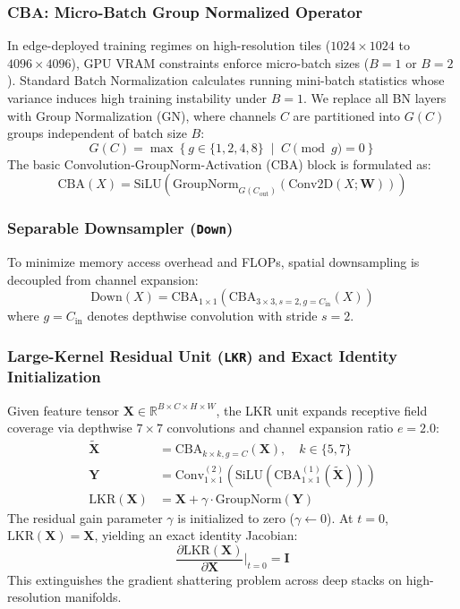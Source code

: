 \documentclass[11pt,a4paper]{article}
\begin{document}
\subsubsection{CBA: Micro-Batch Group Normalized Operator}
In edge-deployed training regimes on high-resolution tiles ($1024\times 1024$ to $4096\times 4096$), GPU VRAM constraints enforce micro-batch sizes ($B=1$ or $B=2$). Standard Batch Normalization calculates running mini-batch statistics whose variance induces high training instability under $B=1$. We replace all BN layers with Group Normalization (GN), where channels $C$ are partitioned into $G(C)$ groups independent of batch size $B$:
\begin{equation}
G(C) = \max \left\{ g \in \{1, 2, 4, 8\} \;\middle|\; C \pmod g = 0 \right\}
\end{equation}
The basic Convolution-GroupNorm-Activation (CBA) block is formulated as:
\begin{equation}
\text{CBA}(X) = \text{SiLU}\left( \text{GroupNorm}_{G(C_{\text{out}})}\left( \text{Conv2D}(X; \mathbf{W}) \right) \right)
\end{equation}

\subsubsection{Separable Downsampler (\texttt{Down})}
To minimize memory access overhead and FLOPs, spatial downsampling is decoupled from channel expansion:
\begin{equation}
\text{Down}(X) = \text{CBA}_{1\times 1}\left( \text{CBA}_{3\times 3, s=2, g=C_{\text{in}}}(X) \right)
\end{equation}
where $g=C_{\text{in}}$ denotes depthwise convolution with stride $s=2$.

\subsubsection{Large-Kernel Residual Unit (\texttt{LKR}) and Exact Identity Initialization}
Given feature tensor $\mathbf{X} \in \mathbb{R}^{B \times C \times H \times W}$, the LKR unit expands receptive field coverage via depthwise $7\times 7$ convolutions and channel expansion ratio $e = 2.0$:
\begin{align}
\widetilde{\mathbf{X}} &= \text{CBA}_{k\times k, g=C}(\mathbf{X}), \quad k \in \{5, 7\} \\
\mathbf{Y} &= \text{Conv}_{1\times 1}^{(2)}\left( \text{SiLU}\left( \text{CBA}_{1\times 1}^{(1)}(\widetilde{\mathbf{X}}) \right) \right) \\
\text{LKR}(\mathbf{X}) &= \mathbf{X} + \gamma \cdot \text{GroupNorm}(\mathbf{Y})
\end{align}
The residual gain parameter $\gamma$ is initialized to zero ($\gamma \leftarrow 0$). At $t=0$, $\text{LKR}(\mathbf{X}) = \mathbf{X}$, yielding an exact identity Jacobian:
\begin{equation}
\frac{\partial \text{LKR}(\mathbf{X})}{\partial \mathbf{X}}\Bigg|_{t=0} = \mathbf{I}
\end{equation}
This extinguishes the gradient shattering problem across deep stacks on high-resolution manifolds.
\end{document}
